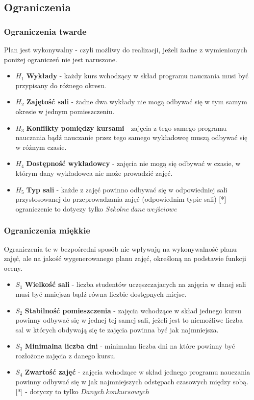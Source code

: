 \subsection{Ograniczenia}
\subsubsection{Ograniczenia twarde}
Plan jest wykonywalny - czyli możliwy do realizacji, jeżeli żadne z wymienionych poniżej ograniczeń nie jest naruszone.
\begin{itemize}
\item  ${H_{1}}$ \textbf{Wykłady} - każdy kurs wchodzący w skład programu nauczania musi być przypisany do różnego okresu.
\item  ${H_{2}}$ \textbf{Zajętość sali} - żadne dwa wykłady nie mogą odbywać się w tym samym okresie w jednym pomieszczeniu.
\item  ${H_{3}}$ \textbf{Konflikty pomiędzy kursami} - zajęcia z tego samego programu nauczania bądź nauczanie przez tego samego wykładowcę muszą odbywać się w różnym czasie.
\item  ${H_{4}}$ \textbf{Dostępność wykładowcy} - zajęcia nie mogą się odbywać w czasie, w którym dany wykładowca nie może prowadzić zajęć.
\item ${H_{5}}$ \textbf{Typ sali} - każde z zajęć powinno odbywać się w odpowiedniej sali przystosowanej do przeprowadzania zajęć (odpowiednim typie sali) [*] - ograniczenie to dotyczy tylko $Szkolne\ dane\ wejściowe$
\end{itemize}
\subsubsection{Ograniczenia miękkie}
Ograniczenia te w bezpośredni sposób nie wpływają na wykonywalność planu zajęć, ale na jakość wygenerowanego planu zajęć, określoną na podstawie funkcji oceny.
\begin{itemize}
\item  ${S_{1}}$ \textbf{Wielkość sali} - liczba studentów uczęszczajacych na zajęcia w danej sali musi być mniejsza bądź równa liczbie dostępnych miejsc.
\item  ${S_{2}}$ \textbf{Stabilność pomieszczenia} - zajęcia wchodzące w skład jednego kursu powinny odbywać się w jednej tej samej sali, jeżeli jest to niemożliwe liczba sal w których obdywają się te zajęcia powinna być jak najmniejsza.
\item  ${S_{3}}$ \textbf{Minimalna liczba dni} - minimalna liczba dni na które powinny być rozłożone zajęcia z danego kursu.
\item  ${S_{4}}$ \textbf{Zwartość zajęć} - zajęcia wchodzące w skład jednego programu nauczania powinny odbywać się w jak najmniejszych odstępach czasowych między sobą. [*] - dotyczy to tylko $Danych\ konkursowych$
\end{itemize}
